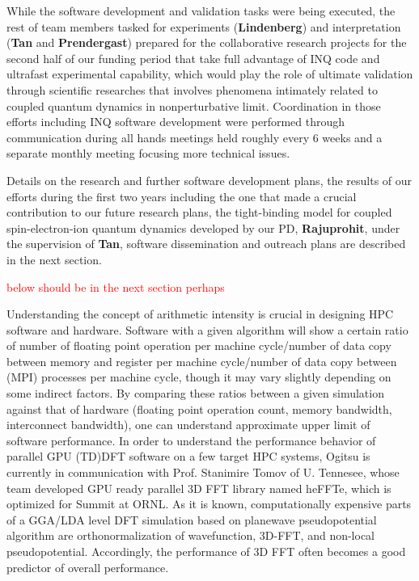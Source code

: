  While the software development and validation tasks were being executed, the rest of team members tasked for experiments ({\bf Lindenberg}) and interpretation ({\bf Tan} and {\bf Prendergast}) prepared for the collaborative research projects for the second half of our funding period that take full advantage of INQ code and ultrafast experimental capability, which would play the role of ultimate validation through scientific researches that involves phenomena intimately related to coupled quantum dynamics in nonperturbative limit. Coordination in those efforts including INQ software development were performed through communication during all hands meetings held roughly every 6 weeks and a separate monthly meeting focusing more technical issues.
 
 Details on the research and further software development plans, the results of our efforts during the first two years including the one that made a crucial contribution to our future research plans, the tight-binding model for coupled spin-electron-ion quantum dynamics developed by our PD, {\bf Rajuprohit}, under the supervision of {\bf Tan}, software dissemination and outreach plans are described in the next section.
 
\clearpage

\textcolor{red}{below should be in the next section perhaps}

Understanding the concept of arithmetic intensity is crucial in designing HPC software and hardware. Software with a given algorithm will show a certain ratio of number of floating point operation per machine cycle/number of data copy between memory and register per machine cycle/number of data copy between (MPI) processes per machine cycle, though it may vary slightly depending on some indirect factors. By comparing these ratios between a given simulation against that of hardware (floating point operation count, memory bandwidth, interconnect bandwidth), one can understand approximate upper limit of software performance. In order to understand the performance behavior of parallel GPU (TD)DFT software on a few target HPC systems, Ogitsu is currently in communication with Prof. Stanimire Tomov of U. Tennesee, whose team developed GPU ready parallel 3D FFT library named heFFTe, which is optimized for Summit at ORNL. As it is known, computationally expensive parts of a GGA/LDA level DFT simulation based on planewave pseudopotential algorithm are orthonormalization of wavefunction, 3D-FFT, and non-local pseudopotential. Accordingly, the performance of 3D FFT often becomes a good predictor of overall performance.




\clearpage